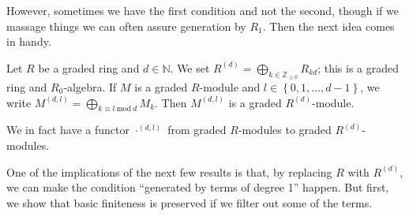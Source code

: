 However, sometimes we have the first condition and not the second, though if
we massage things we can often assure generation by $R_1$. Then the
next idea comes in handy.

\begin{definition} 
\label{dpowerofring}
Let $R$ be a graded ring and $d \in \mathbb{N}$. We set $R^{(d)} = \bigoplus_{k
\in \mathbb{Z}_{\geq 0}} R_{kd}$; this is a graded ring and $R_0$-algebra.  If $M$ is a graded $R$-module and $l \in
\left\{0, 1, \dots, d-1\right\}$, we write $M^{(d,l)} = \bigoplus_{k \equiv l
 \ \mathrm{mod} \  d} M_k$. Then $M^{(d,l)}$ is a graded $R^{(d)}$-module. 
\end{definition} 

We in fact have a functor $\cdot^{(d,l)}$ from graded $R$-modules to graded
$R^{(d)}$-modules.


One of the implications of the next few results is that, by replacing $R$ with
$R^{(d)}$, we can make the condition ``generated by terms of degree 1'' happen.
But first, we show that basic finiteness is preserved if we filter out some of
the terms.

